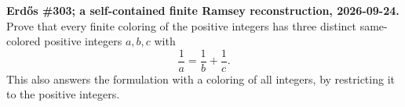 \textbf{Erd\H{o}s \#303; a self-contained finite Ramsey reconstruction, 2026-09-24.}
Prove that every finite coloring of the positive integers has three distinct same-colored positive integers $a,b,c$ with
\[
\frac1a=\frac1b+\frac1c.
\]
This also answers the formulation with a coloring of all integers, by restricting it to the positive integers.
